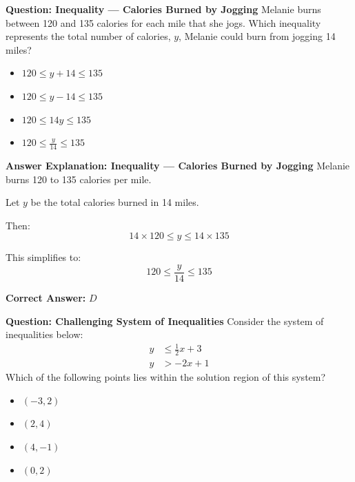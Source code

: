 \documentclass{beamer}
\begin{document}
\begin{frame}{\textbf{Question: Inequality — Calories Burned by Jogging}}
    Melanie burns between 120 and 135 calories for each mile that she jogs.
    Which inequality represents the total number of calories, \(y\),
    Melanie could burn from jogging 14 miles?

    \vspace{1em}
    \begin{itemize}
        \item[\textbf{A.}] \(120 \leq y + 14 \leq 135\)
        \item[\textbf{B.}] \(120 \leq y - 14 \leq 135\)
        \item[\textbf{C.}] \(120 \leq 14y \leq 135\)
        \item[\textbf{D.}] \(120 \leq \frac{y}{14} \leq 135\)
    \end{itemize}
\end{frame}

\begin{frame}{\textbf{Answer Explanation: Inequality — Calories Burned by Jogging}}
    Melanie burns 120 to 135 calories per mile.

    Let \(y\) be the total calories burned in 14 miles.

    Then:
    \[
    14 \times 120 \leq y \leq 14 \times 135
    \]

    This simplifies to:
    \[
    120 \leq \frac{y}{14} \leq 135
    \]

    \textbf{Correct Answer:} \( \boxed{D} \)
\end{frame}

\begin{frame}{\textbf{Question: Challenging System of Inequalities}}
    Consider the system of inequalities below:
    \[
    \begin{aligned}
    y &\leq \frac{1}{2}x + 3 \\
    y &> -2x + 1
    \end{aligned}
    \]
    Which of the following points lies within the solution region of this system?

    \vspace{1em}
    \begin{itemize}
        \item[\textbf{A.}] \((-3, 2)\)
        \item[\textbf{B.}] \((2, 4)\)
        \item[\textbf{C.}] \((4, -1)\)
        \item[\textbf{D.}] \((0, 2)\)
    \end{itemize}
\end{frame}
\end{document}
